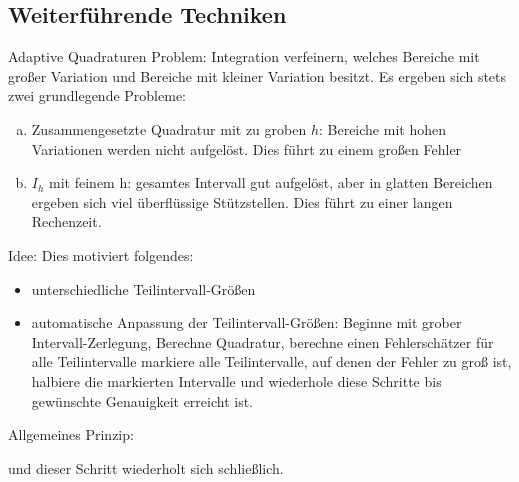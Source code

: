 \documentclass[11pt]{scrartcl}
\begin{document}
\subsection{Weiterführende Techniken}
\begin{seg}{Adaptive Quadraturen}
	Problem: Integration verfeinern, welches Bereiche mit großer Variation und Bereiche mit kleiner Variation besitzt. Es ergeben sich stets zwei grundlegende Probleme:
	\begin{enumerate}[a)]
		\item Zusammengesetzte Quadratur mit zu groben $h$: Bereiche mit hohen Variationen werden nicht aufgelöst. Dies führt zu einem großen Fehler
		\item $I_h$ mit feinem h: gesamtes Intervall gut aufgelöst, aber in glatten Bereichen ergeben sich viel überflüssige Stützstellen. Dies führt zu einer langen Rechenzeit.
	\end{enumerate}
\end{seg}
\begin{seg}{Idee:}
	Dies motiviert folgendes:
	\begin{itemize}
		\item unterschiedliche Teilintervall-Größen
		\item automatische Anpassung der Teilintervall-Größen: Beginne mit grober Intervall-Zerlegung, Berechne Quadratur, berechne einen Fehlerschätzer für alle Teilintervalle markiere alle Teilintervalle, auf denen der Fehler zu groß ist, halbiere die markierten Intervalle und wiederhole diese Schritte bis gewünschte Genauigkeit erreicht ist.
	\end{itemize}
\end{seg}
\begin{seg}{Allgemeines Prinzip:}
	\begin{figure}[ht]
\end{figure}
und dieser Schritt wiederholt sich schließlich.
\end{seg}
\end{document}
